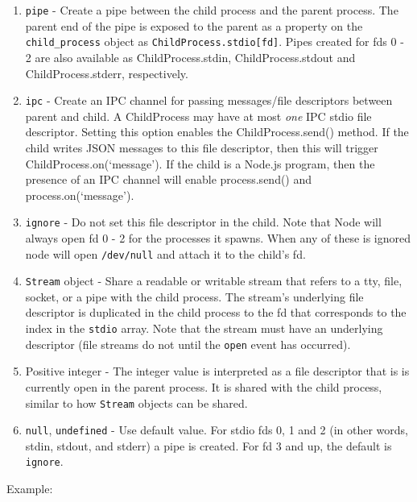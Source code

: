 \begin{enumerate}
\def\labelenumi{\arabic{enumi}.}
\itemsep1pt\parskip0pt
\item
  \texttt{\textquotesingle{}pipe\textquotesingle{}} - Create a pipe
  between the child process and the parent process. The parent end of
  the pipe is exposed to the parent as a property on the
  \texttt{child\_process} object as \texttt{ChildProcess.stdio{[}fd{]}}.
  Pipes created for fds 0 - 2 are also available as ChildProcess.stdin,
  ChildProcess.stdout and ChildProcess.stderr, respectively.
\item
  \texttt{\textquotesingle{}ipc\textquotesingle{}} - Create an IPC
  channel for passing messages/file descriptors between parent and
  child. A ChildProcess may have at most \emph{one} IPC stdio file
  descriptor. Setting this option enables the ChildProcess.send()
  method. If the child writes JSON messages to this file descriptor,
  then this will trigger ChildProcess.on(`message'). If the child is a
  Node.js program, then the presence of an IPC channel will enable
  process.send() and process.on(`message').
\item
  \texttt{\textquotesingle{}ignore\textquotesingle{}} - Do not set this
  file descriptor in the child. Note that Node will always open fd 0 - 2
  for the processes it spawns. When any of these is ignored node will
  open \texttt{/dev/null} and attach it to the child's fd.
\item
  \texttt{Stream} object - Share a readable or writable stream that
  refers to a tty, file, socket, or a pipe with the child process. The
  stream's underlying file descriptor is duplicated in the child process
  to the fd that corresponds to the index in the \texttt{stdio} array.
  Note that the stream must have an underlying descriptor (file streams
  do not until the \texttt{\textquotesingle{}open\textquotesingle{}}
  event has occurred).
\item
  Positive integer - The integer value is interpreted as a file
  descriptor that is is currently open in the parent process. It is
  shared with the child process, similar to how \texttt{Stream} objects
  can be shared.
\item
  \texttt{null}, \texttt{undefined} - Use default value. For stdio fds
  0, 1 and 2 (in other words, stdin, stdout, and stderr) a pipe is
  created. For fd 3 and up, the default is
  \texttt{\textquotesingle{}ignore\textquotesingle{}}.
\end{enumerate}

Example:

